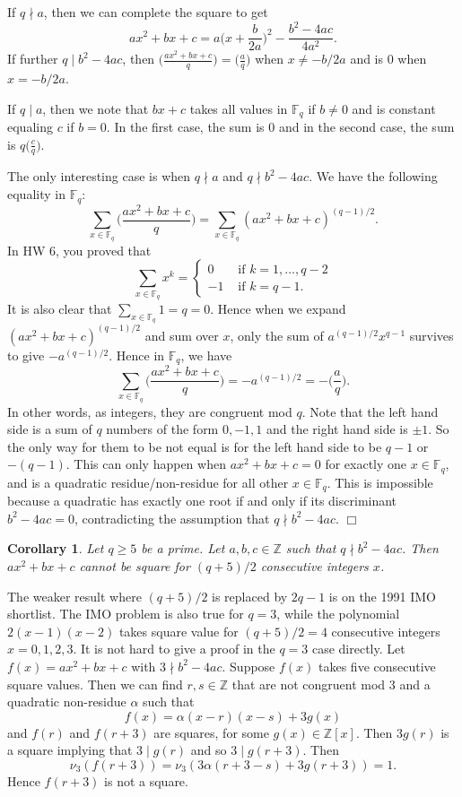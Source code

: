 \documentclass{article}
\def\Z{{\mathbb Z}}
\def\F{{\mathbb F}}
\def\Z{{\mathbb Z}}
\def\F{{\mathbb F}}
\newtheorem{cor}[subsection]{Corollary}
\newenvironment{proof}{\noindent {\bf Proof:}}{$\Box$ \vspace{2 ex}}
\renewcommand{\lg}[2]{\Big(\frac{#1}{#2}\Big)}
\begin{document}
\begin{proof}
    If $q\nmid a$, then we can complete the square to get
    $$ax^2 + bx + c = a\Big(x + \frac{b}{2a}\Big)^2 - \frac{b^2 - 4ac}{4a^2}.$$
    If further $q\mid b^2 - 4ac$, then $\displaystyle\lg{ax^2 + bx + c}{q} = \lg{a}{q}$ when $x\neq -b/2a$ and is $0$ when $x = -b/2a$.

    If $q\mid a$, then we note that $bx + c$ takes all values in $\F_q$ if $b \neq 0$ and is constant equaling $c$ if $b = 0$. In the first case, the sum is $0$ and in the second case, the sum is $q\lg{c}{q}$.

    The only interesting case is when $q\nmid a$ and $q\nmid b^2 - 4ac$. We have the following equality in $\F_q$:
    $$\sum_{x\in\F_q}\lg{ax^2 + bx + c}{q} = \sum_{x\in\F_q}(ax^2 + bx + c)^{(q-1)/2}.$$
    In HW 6, you proved that $$\sum_{x\in\F_q}x^k = \begin{cases}
        0&\mbox{ if }k=1,\ldots,q-2\\
        -1&\mbox{ if }k = q-1.
    \end{cases}$$
    It is also clear that $\sum_{x\in\F_q}1 = q = 0$. Hence when we expand $(ax^2 + bx + c)^{(q-1)/2}$ and sum over $x$, only the sum of $a^{(q-1)/2}x^{q-1}$ survives to give $-a^{(q-1)/2}.$ Hence in $\F_q$, we have
    $$\sum_{x\in\F_q}\lg{ax^2 + bx + c}{q} = -a^{(q-1)/2} = -\lg{a}{q}.$$
    In other words, as integers, they are congruent mod $q$. Note that the left hand side is a sum of $q$ numbers of the form $0,-1,1$ and the right hand side is $\pm 1$. So the only way for them to be not equal is for the left hand side to be $q-1$ or $-(q-1)$. This can only happen when $ax^2 + bx + c=0$ for exactly one $x\in\F_q$, and is a quadratic residue/non-residue for all other $x\in\F_q$. This is impossible because a quadratic has exactly one root if and only if its discriminant $b^2 - 4ac = 0$, contradicting the assumption that $q\nmid b^2 - 4ac.$
\end{proof}

\begin{cor}
    Let $q\geq5$ be a prime. Let $a,b,c\in\Z$ such that $q\nmid b^2 - 4ac$. Then $ax^2 + bx + c$ cannot be square for $(q+5)/2$ consecutive integers $x$.
\end{cor}

The weaker result where $(q+5)/2$ is replaced by $2q - 1$ is on the 1991 IMO shortlist. The IMO problem is also true for $q = 3$, while the polynomial $2(x-1)(x-2)$ takes square value for $(q+5)/2=4$ consecutive integers $x = 0,1,2,3$. It is not hard to give a proof in the $q = 3$ case directly. Let $f(x) = ax^2 + bx + c$ with $3\nmid b^2 - 4ac$. Suppose $f(x)$ takes five consecutive square values. Then we can find $r,s\in\Z$ that are not congruent mod $3$ and a quadratic non-residue $\alpha$ such that $$f(x) = \alpha(x - r)(x - s) + 3g(x)$$
and $f(r)$ and $f(r+3)$ are squares, for some $g(x)\in\Z[x]$. Then $3g(r)$ is a square implying that $3\mid g(r)$ and so $3\mid g(r+3)$. Then $$\nu_3(f(r+3)) = \nu_3(3\alpha(r+3-s) + 3g(r+3)) = 1.$$
Hence $f(r+3)$ is not a square.
\end{document}

